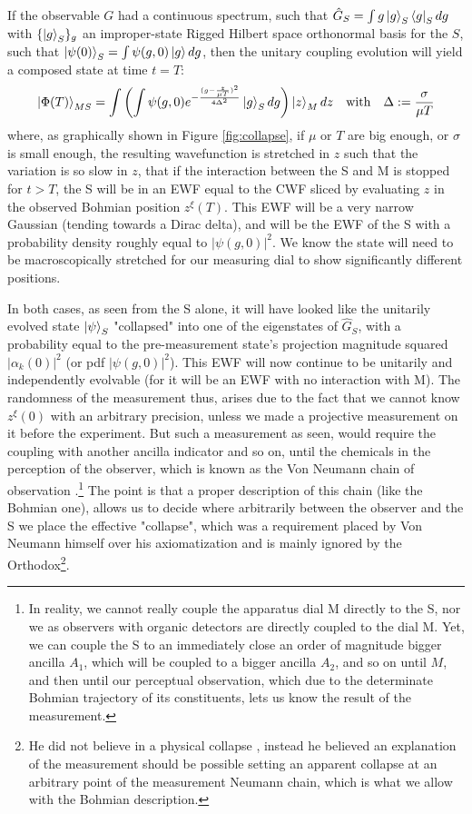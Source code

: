\documentclass[11pt, a4paper]{article} %
\begin{document}
If the observable $G$ had a continuous spectrum, such that $\hat{G}_S=\int g\ket{g}_S\bra{g}_Sdg$ with $\{\ket{g}_S\}_g$ an improper-state Rigged Hilbert space orthonormal basis for the $S$, such that $\ket{\psi(0)}_S=\int\psi(g,0)\ket{g}dg$, then the unitary coupling evolution will yield a composed state at time $t=T$:
\begin{equation}\label{postM2}
\ket{\Phi(T)}_{MS}=\int\qty(\int\psi(g,0)e^{-\frac{(g-\frac{z}{\mu T})^2}{4\Delta^2}}\ket{g}_S dg)\ket{z}_Mdz\quad \text{with} \quad \Delta:=\frac{\sigma}{\mu T}
\end{equation}
where, as graphically shown in Figure \ref{fig:collapse}, if $\mu$ or $T$ are big enough, or $\sigma$ is small enough, the resulting wavefunction is stretched in $z$ such that the variation is so slow in $z$, that if the interaction between the S and M is stopped for $t>T$, the S will be in an EWF equal to the CWF sliced by evaluating $z$ in the observed Bohmian position $z^\xi(T)$. This EWF will be a very narrow Gaussian (tending towards a Dirac delta), and will be the EWF of the S with a probability density roughly equal to $|\psi(g,0)|^2$. We know the state will need to be macroscopically stretched for our measuring dial to show significantly different positions.

\newpage
In both cases, as seen from the S alone, it will have looked like the unitarily evolved state $\ket{\psi}_S$ "collapsed" into one of the eigenstates of $\hat{G}_S$, with a probability equal to the pre-measurement state's projection magnitude squared $|\alpha_k(0)|^2$ (or pdf $|\psi(g,0)|^2$). This EWF will now continue to be unitarily and independently evolvable (for it will be an EWF with no interaction with M). The randomness of the measurement thus, arises due to the fact that we cannot know $z^\xi(0)$ with an arbitrary precision, unless we made a projective measurement on it before the experiment. But such a measurement as seen, would require the coupling with another ancilla indicator and so on, until the chemicals in the perception of the observer, which is known as the Von Neumann chain of observation \cite{VonNeumann}.\footnote{In reality, we cannot really couple the apparatus dial M directly to the S, nor we as observers with organic detectors are directly coupled to the dial M. Yet, we can couple the S to an immediately close an order of magnitude bigger ancilla $A_1$, which will be coupled to a bigger ancilla $A_2$, and so on until $M$, and then until our perceptual observation, which due to the determinate Bohmian trajectory of its constituents, lets us know the result of the measurement.} The point is that a proper description of this chain (like the Bohmian one), allows us to decide where arbitrarily between the observer and the S we place the effective "collapse", which was a requirement placed by Von Neumann himself \cite{VonNeumann} over his axiomatization and is mainly ignored by the Orthodox\footnote{He did not believe in a physical collapse \cite{NeumannNoCollapse}, instead he believed an explanation of the measurement should be possible setting an apparent collapse at an arbitrary point of the measurement Neumann chain, which is what we allow with the Bohmian description.}.
\end{document}
